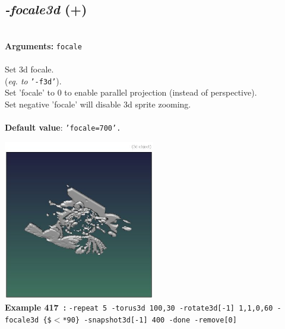 \documentclass[a4paper,11pt,twoside]{book}
\begin{document}
\subsection{\emph{-focale3d} (+)}\vspace*{-0.5em}
~\\\textbf{Arguments: } 
{\small \texttt{focale}}\\~\\
Set 3d focale.
~\\(\emph{eq. to} {\small \texttt{'-f3d'}}).
~\\Set 'focale' to 0 to enable parallel projection (instead of perspective).
~\\Set negative 'focale' will disable 3d sprite zooming.
~\\~\\\textbf{Default value}: {\small \texttt{'focale=700'.}}
\begin{center}\includegraphics[keepaspectratio=true,height=7cm,width=\textwidth]{img/gmic_def417.jpg}\\
{\footnotesize \textbf{Example 417~:} \texttt{-repeat 5 -torus3d 100,30 -rotate3d[-1] 1,1,0,60 -focale3d \{\$$<$*90\} -snapshot3d[-1] 400 -done -remove[0]}}
\end{center}
\end{document}
